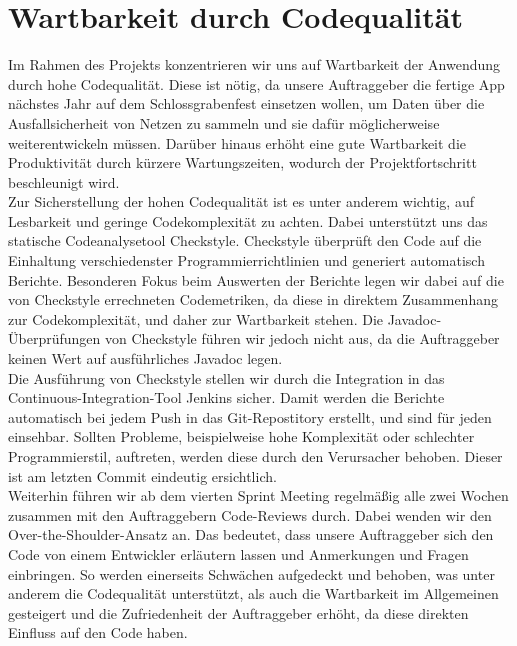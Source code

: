 \documentclass[accentcolor=tud0b,12pt,paper=a4]{tudreport}
\begin{document}
    \section{Wartbarkeit durch Codequalität}
      Im Rahmen des Projekts konzentrieren wir uns auf Wartbarkeit der Anwendung durch hohe Codequalität. Diese ist nötig, da unsere Auftraggeber die fertige App nächstes Jahr auf dem Schlossgrabenfest einsetzen wollen, um Daten über die Ausfallsicherheit von Netzen zu sammeln und sie dafür möglicherweise weiterentwickeln müssen. Darüber hinaus erhöht eine gute Wartbarkeit die Produktivität durch kürzere Wartungszeiten, wodurch der Projektfortschritt beschleunigt wird.\\

      Zur Sicherstellung der hohen Codequalität ist es unter anderem wichtig, auf Lesbarkeit und geringe Codekomplexität zu achten. Dabei unterstützt uns das statische Codeanalysetool Checkstyle. Checkstyle überprüft den Code auf die Einhaltung verschiedenster Programmierrichtlinien und generiert automatisch Berichte. Besonderen Fokus beim Auswerten der Berichte legen wir dabei auf die von Checkstyle errechneten Codemetriken, da diese in direktem Zusammenhang zur Codekomplexität, und daher zur Wartbarkeit stehen. Die Javadoc-Überprüfungen von Checkstyle führen wir jedoch nicht aus, da die Auftraggeber keinen Wert auf ausführliches Javadoc legen.\\

      Die Ausführung von Checkstyle stellen wir durch die Integration in das Continuous-Integration-Tool Jenkins sicher. Damit werden die Berichte automatisch bei jedem Push in das Git-Repostitory erstellt, und sind für jeden einsehbar. Sollten Probleme, beispielweise hohe Komplexität oder schlechter Programmierstil, auftreten, werden diese durch den Verursacher behoben. Dieser ist am letzten Commit eindeutig ersichtlich.\\

      Weiterhin führen wir ab dem vierten Sprint Meeting regelmäßig alle zwei Wochen zusammen mit den Auftraggebern Code-Reviews durch. Dabei wenden wir den Over-the-Shoulder-Ansatz an. Das bedeutet, dass unsere Auftraggeber sich den Code von einem Entwickler erläutern lassen und Anmerkungen und Fragen einbringen. So werden einerseits Schwächen aufgedeckt und behoben, was unter anderem die Codequalität unterstützt, als auch die Wartbarkeit im Allgemeinen gesteigert und die Zufriedenheit der Auftraggeber erhöht, da diese direkten Einfluss auf den Code haben.\\
\end{document}

